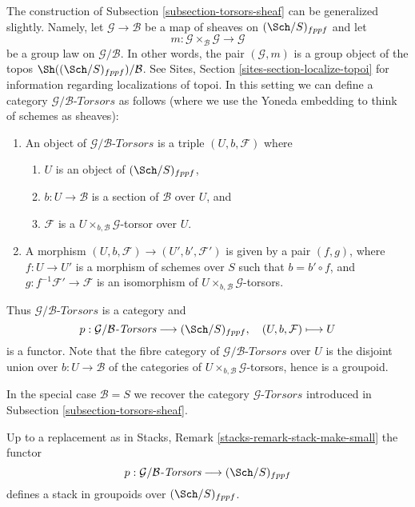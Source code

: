 \noindent
The construction of
Subsection \ref{subsection-torsors-sheaf}
can be generalized slightly.
Namely, let $\mathcal{G} \to \mathcal{B}$ be a map of sheaves
on $(\Sch/S)_{fppf}$ and let
$$
m :
\mathcal{G} \times_\mathcal{B} \mathcal{G}
\longrightarrow
\mathcal{G}
$$
be a group law on $\mathcal{G}/\mathcal{B}$. In other words, the pair
$(\mathcal{G}, m)$ is a group object of the topos
$\Sh((\Sch/S)_{fppf})/\mathcal{B}$. See
Sites, Section \ref{sites-section-localize-topoi}
for information regarding localizations of topoi.
In this setting we can define a category
$\mathcal{G}/\mathcal{B}\textit{-Torsors}$ as follows
(where we use the Yoneda embedding to think of schemes as sheaves):
\begin{enumerate}
\item An object of $\mathcal{G}/\mathcal{B}\textit{-Torsors}$ is a triple
$(U, b, \mathcal{F})$ where
\begin{enumerate}
\item $U$ is an object of $(\Sch/S)_{fppf}$,
\item $b : U \to \mathcal{B}$ is a section of $\mathcal{B}$ over $U$, and
\item $\mathcal{F}$ is a $U \times_{b, \mathcal{B}}\mathcal{G}$-torsor
over $U$.
\end{enumerate}
\item A morphism $(U, b, \mathcal{F}) \to (U', b', \mathcal{F}')$ is given
by a pair $(f, g)$, where $f : U \to U'$ is a morphism of schemes
over $S$ such that $b = b' \circ f$, and
$g : f^{-1}\mathcal{F}' \to \mathcal{F}$ is an
isomorphism of $U \times_{b, \mathcal{B}} \mathcal{G}$-torsors.
\end{enumerate}
Thus $\mathcal{G}/\mathcal{B}\textit{-Torsors}$ is a category and
$$
p :
\mathcal{G}/\mathcal{B}\textit{-Torsors}
\longrightarrow
(\Sch/S)_{fppf},
\quad
(U, b, \mathcal{F}) \longmapsto U
$$
is a functor. Note that the fibre category of
$\mathcal{G}/\mathcal{B}\textit{-Torsors}$
over $U$ is the disjoint union over $b : U \to \mathcal{B}$
of the categories of $U \times_{b, \mathcal{B}} \mathcal{G}$-torsors,
hence is a groupoid.

\medskip\noindent
In the special case $\mathcal{B} = S$ we recover the category
$\mathcal{G}\textit{-Torsors}$ introduced in
Subsection \ref{subsection-torsors-sheaf}.

\begin{lemma}
\label{lemma-variant-torsors-sheaf-stack-in-groupoids}
Up to a replacement as in
Stacks, Remark \ref{stacks-remark-stack-make-small}
the functor
$$
p :
\mathcal{G}/\mathcal{B}\textit{-Torsors}
\longrightarrow
(\Sch/S)_{fppf}
$$
defines a stack in groupoids over $(\Sch/S)_{fppf}$.
\end{lemma}

